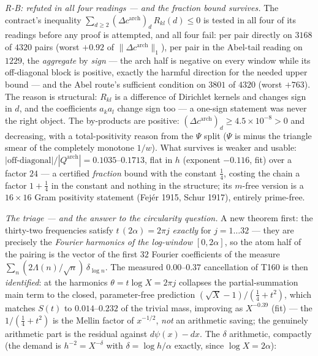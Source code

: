 \documentclass[11pt,a4paper]{article}
\begin{document}
\emph{R-B: refuted in all four readings --- and the fraction bound survives.} The
contract's inequality $\sum_{d\ge2}(\Delta c^{\mathrm{arch}})_d\,R_{kl}(d)\le0$ is
tested in all four of its readings before any proof is attempted, and all four
fail: per pair directly on $3168$ of $4320$ pairs (worst $+0.92$ of
$\|\Delta c^{\mathrm{arch}}\|_1$), per pair in the Abel-tail reading on $1229$, the
\emph{aggregate} by \emph{sign} --- the arch half is negative on every window while
its off-diagonal block is positive, exactly the harmful direction for the needed
upper bound --- and the Abel route's sufficient condition on $3801$ of $4320$
(worst $+763$). The reason is structural: $R_{kl}$ is a difference of Dirichlet
kernels and changes sign in $d$, and the coefficients $a_ka_l$ change sign too ---
a one-sign statement was never the right object. The by-products are positive:
$(\Delta c^{\mathrm{arch}})_d\ge4.5\times10^{-8}>0$ and decreasing, with a
total-positivity reason from the $\Psi$ split ($\Psi$ is minus the triangle smear
of the completely monotone $1/w$). What survives is weaker and usable:
$|\text{off-diagonal}|/|Q^{\mathrm{arch}}|=0.1035$--$0.1713$, flat in $h$ (exponent
$-0.116$, fit) over a factor $24$ --- a certified \emph{fraction} bound with the
constant $\tfrac14$, costing the chain a factor $1+\tfrac14$ in the constant and
nothing in the structure; its $m$-free version is a $16\times16$ Gram positivity
statement (Fej\'er 1915, Schur 1917), entirely prime-free.

\emph{The triage --- and the answer to the circularity question.} A new theorem
first: the thirty-two frequencies satisfy $t\,(2\alpha)=2\pi j$ \emph{exactly} for
$j=1\ldots32$ --- they are precisely the \emph{Fourier harmonics of the
log-window} $[0,2\alpha]$, so the atom half of the pairing is the vector of the
first $32$ Fourier coefficients of the measure
$\sum_n(2\Lambda(n)/\sqrt n)\,\delta_{\log n}$. The measured $0.00$--$0.37$
cancellation of T160 is then \emph{identified}: at the harmonics
$\theta=t\log X=2\pi j$ collapses the partial-summation main term to the closed,
parameter-free prediction $(\sqrt X-1)/(\tfrac14+t^2)$, which matches $S(t)$ to
$0.014$--$0.232$ of the trivial mass, improving as $X^{-0.39}$ (fit) --- the
$1/(\tfrac14+t^2)$ is the Mellin factor of $x^{-1/2}$, \emph{not} an arithmetic
saving; the genuinely arithmetic part is the residual against $d\psi(x)-dx$. The
$\delta$ arithmetic, compactly (the demand is $h^{-2}=X^{-\delta}$ with
$\delta=\log h/\alpha$ exactly, since $\log X=2\alpha$):
\end{document}
